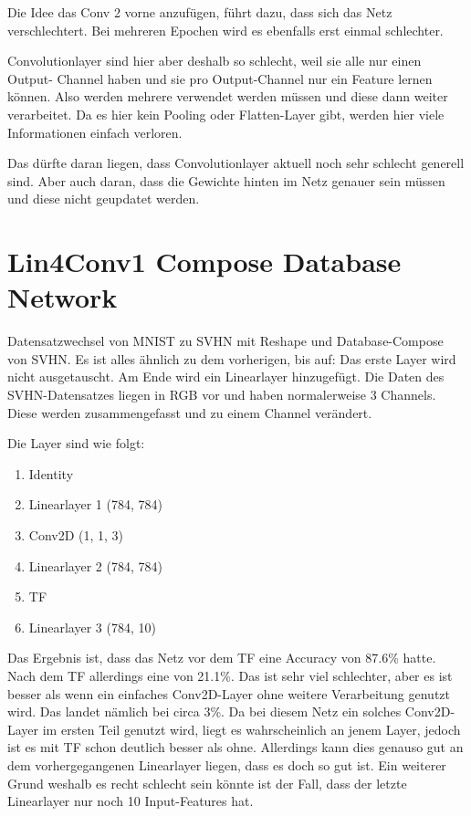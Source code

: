     Die Idee das Conv 2 vorne anzufügen, führt dazu, dass sich das Netz verschlechtert. 
    Bei mehreren Epochen wird es ebenfalls erst einmal schlechter.


    Convolutionlayer sind hier aber deshalb so schlecht, weil sie alle nur einen Output-
    Channel haben und sie pro Output-Channel nur ein Feature lernen können.
    Also werden mehrere verwendet werden müssen und diese dann weiter verarbeitet. 
    Da es hier kein Pooling oder Flatten-Layer gibt, werden hier viele Informationen 
    einfach verloren.


    Das dürfte daran liegen, dass Convolutionlayer aktuell noch sehr schlecht generell sind. 
    Aber auch daran, dass die Gewichte hinten im Netz genauer sein müssen und diese nicht 
    geupdatet werden. 

\section{Lin4Conv1 Compose Database Network}
    Datensatzwechsel von MNIST zu SVHN mit Reshape und Database-Compose von SVHN. 
    Es ist alles ähnlich zu dem vorherigen, bis auf: 
    Das erste Layer wird nicht ausgetauscht. Am Ende wird ein Linearlayer hinzugefügt. 
    Die Daten des SVHN-Datensatzes liegen in RGB vor und haben normalerweise 3 Channels. 
    Diese werden zusammengefasst und zu einem Channel verändert.

    Die Layer sind wie folgt: 
    \begin{enumerate}
        \item Identity
        \item Linearlayer 1 (784, 784)
        \item Conv2D (1, 1, 3)
        \item Linearlayer 2 (784, 784)
        \item TF
        \item Linearlayer 3 (784, 10)
    \end{enumerate}

    Das Ergebnis ist, dass das Netz vor dem TF eine Accuracy von 87.6\% hatte. Nach 
    dem TF allerdings eine von 21.1\%. Das ist sehr viel schlechter, aber es ist besser als 
    wenn ein einfaches Conv2D-Layer ohne weitere Verarbeitung genutzt wird. Das landet 
    nämlich bei circa 3\%. Da bei diesem Netz ein solches Conv2D-Layer im ersten Teil 
    genutzt wird, liegt es wahrscheinlich an jenem Layer, jedoch ist es mit TF schon 
    deutlich besser als ohne. Allerdings kann dies genauso gut an dem vorhergegangenen 
    Linearlayer liegen, dass es doch so gut ist. Ein weiterer Grund weshalb es recht schlecht 
    sein könnte ist der Fall, dass der letzte Linearlayer nur noch 10 Input-Features hat.

